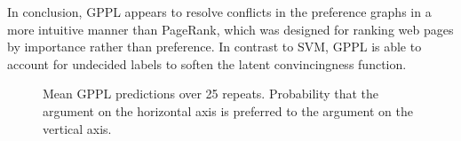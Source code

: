 In conclusion, GPPL appears to resolve conflicts in the preference graphs in a
more intuitive manner than PageRank, which was designed for ranking web pages by 
importance rather than preference. 
In contrast to SVM, GPPL is able to account for undecided labels to soften the latent convincingness function.
\begin{figure}
\centering
{}
\caption{Mean GPPL predictions over 25 repeats. Probability that the argument 
on the horizontal axis is preferred to the argument on the vertical axis.}
\label{fig:gppl_classification}
\end{figure}
